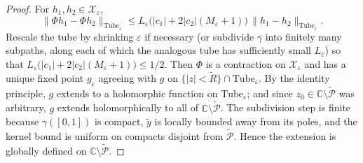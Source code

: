 \documentclass[11pt]{article}
\theoremstyle{definition}
\theoremstyle{remark}
\begin{document}
\begin{proof}
For $h_{1},h_{2}\in\mathcal{X}_{\varepsilon}$,
\begin{equation}
\|\Phi h_{1}-\Phi h_{2}\|_{\overline{\mathrm{Tube}}_{\varepsilon}}
\le L_{\varepsilon}\bigl(|c_{1}|+2|c_{2}|(M_{\varepsilon}+1)\bigr)\,\|h_{1}-h_{2}\|_{\overline{\mathrm{Tube}}_{\varepsilon}}.
\label{eq:contraction-bound}
\end{equation}
Rescale the tube by shrinking $\varepsilon$ if necessary (or subdivide $\gamma$ into finitely many subpaths, along each of which the analogous tube has sufficiently small $L_{\hat\varepsilon}$) so that $L_{\varepsilon}\bigl(|c_{1}|+2|c_{2}|(M_{\varepsilon}+1)\bigr)\le 1/2$. Then $\Phi$ is a contraction on $\mathcal{X}_{\varepsilon}$ and has a unique fixed point $g_{\varepsilon}$ agreeing with $g$ on $\{|z|<\tilde R\}\cap\mathrm{Tube}_{\varepsilon}$. By the identity principle, $g$ extends to a holomorphic function on $\mathrm{Tube}_{\varepsilon}$; and since $z_{0}\in\mathbb{C}\setminus\widetilde{\mathcal{P}}$ was arbitrary, $g$ extends holomorphically to all of $\mathbb{C}\setminus\widetilde{\mathcal{P}}$. The subdivision step is finite because $\gamma([0,1])$ is compact, $\tilde y$ is locally bounded away from its poles, and the kernel bound is uniform on compacts disjoint from $\widetilde{\mathcal{P}}$. Hence the extension is globally defined on $\mathbb{C}\setminus\widetilde{\mathcal{P}}$.


\end{proof}
\end{document}
